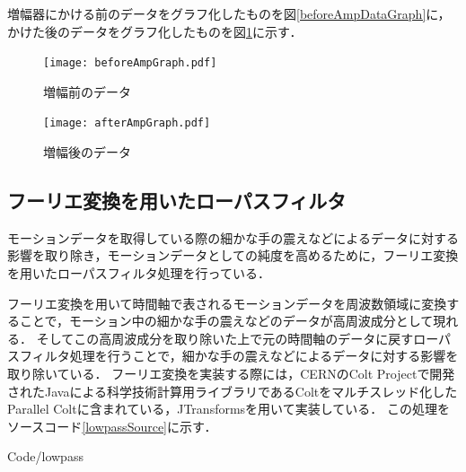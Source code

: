 \documentclass[11pt]{jreport}
\renewcommand{\slash}{/}
\begin{document}
        増幅器にかける前のデータをグラフ化したものを図\ref{beforeAmpDataGraph}に，かけた後のデータをグラフ化したものを図\ref{afterAmpDataGraph}に示す．

        \begin{figure}[btp]
            \begin{minipage}{0.5\hsize}
                \begin{center}
                    \texttt{[image: beforeAmpGraph.pdf]}
                \end{center}
                \caption{増幅前のデータ}
                \label{beforeAmpDataGraph}
            \end{minipage}
            \begin{minipage}{0.5\hsize}
                \begin{center}
                    \texttt{[image: afterAmpGraph.pdf]}
                \end{center}
                \caption{増幅後のデータ}
                \label{afterAmpDataGraph}
            \end{minipage}
        \end{figure}

        \subsection{フーリエ変換を用いたローパスフィルタ}
        モーションデータを取得している際の細かな手の震えなどによるデータに対する影響を取り除き，モーションデータとしての純度を高めるために，フーリエ変換を用いたローパスフィルタ処理を行っている．

        フーリエ変換を用いて時間軸で表されるモーションデータを周波数領域に変換することで，モーション中の細かな手の震えなどのデータが高周波成分として現れる．
        そしてこの高周波成分を取り除いた上で元の時間軸のデータに戻すローパスフィルタ処理を行うことで，細かな手の震えなどによるデータに対する影響を取り除いている．
        フーリエ変換を実装する際には，CERNのColt Project\cite{coltproj}で開発されたJavaによる科学技術計算用ライブラリであるColt\cite{colt}をマルチスレッド化したParallel Colt\cite{parallelcolt}に含まれている，JTransforms\cite{jtransforms}を用いて実装している．
        この処理をソースコード\ref{lowpassSource}に示す．

        
        {Code\slash lowpass}
\end{document}
